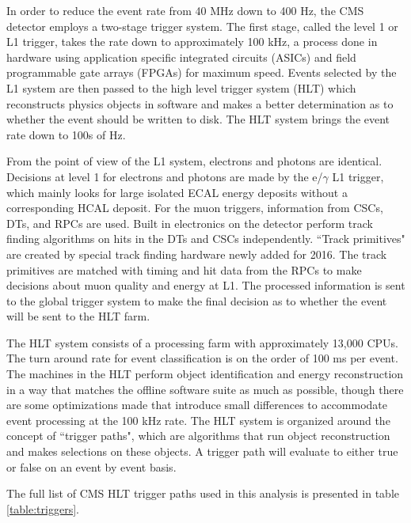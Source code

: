     In order to reduce the event rate from 40 MHz down to 400 Hz, the CMS detector employs a two-stage trigger system. The first stage, called the level 1 or L1 trigger, takes the rate down to approximately 100 kHz, a process done in hardware using application specific integrated circuits (ASICs) and field programmable gate arrays (FPGAs) for maximum speed. Events selected by the L1 system are then passed to the high level trigger system (HLT) which reconstructs physics objects in software and makes a better determination as to whether the event should be written to disk. The HLT system brings the event rate down to 100s of Hz.

    From the point of view of the L1 system, electrons and photons are identical. Decisions at level 1 for electrons and photons are made by the e/$\gamma$ L1 trigger, which mainly looks for large isolated ECAL energy deposits without a corresponding HCAL deposit. For the muon triggers, information from CSCs, DTs, and RPCs are used. Built in electronics on the detector perform track finding algorithms on hits in the DTs and CSCs independently. ``Track primitives" are created by special track finding hardware newly added for 2016. The track primitives are matched with timing and hit data from the RPCs to make decisions about muon quality and energy at L1. The processed information is sent to the global trigger system to make the final decision as to whether the event will be sent to the HLT farm.

    The HLT system consists of a processing farm with approximately 13,000 CPUs. The turn around rate for event classification is on the order of 100 ms per event. The machines in the HLT perform object identification and energy reconstruction in a way that matches the offline software suite as much as possible, though there are some optimizations made that introduce small differences to accommodate event processing at the 100 kHz rate. The HLT system is organized around the concept of ``trigger paths", which are algorithms that run object reconstruction and makes selections on these objects. A trigger path will evaluate to either true or false on an event by event basis. 

    The full list of CMS HLT trigger paths used in this analysis is presented in table \ref{table:triggers}. 


